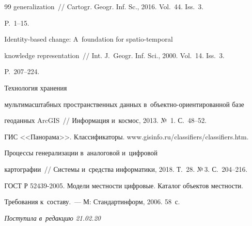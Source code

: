 {{\begin{thebibliography}{99}
generalization~/\!\!/ Cartogr. Geogr. Inf. Sc., 2016. Vol.~44. Iss.~3. 


P.~1--15.




 Identity-based change: A~foundation for spatio-temporal 


knowledge representation~/\!\!/ Int. J.~Geogr. Inf. Sci., 2000. Vol.~14. Iss.~3. 


P.~207--224.




   Технология хранения 


мультимасштабных пространственных данных в~объектно-ориентированной базе 


геоданных ArcGIS~/\!\!/ Информация и~космос, 2013. №~1. С.~48--52.




  ГИС <<Панорама>>. Классификаторы. {\sf www.gisinfo.ru/classifiers/classifiers.htm}.


  


  \pagebreak


  




   Процессы генерализации в~аналоговой и~цифровой 


картографии~/\!\!/ Системы и~средства информатики, 2018. Т.~28. №\,3. С.~204--216.




  ГОСТ Р 52439-2005. Модели местности цифровые. Каталог объектов местности. 


Требования к~составу.~--- М: Стандартинформ, 2006. 58~с.





 \end{thebibliography}


} }








\vspace*{-3pt}





\hfill{\small\textit{Поступила в~редакцию 21.02.20}}








